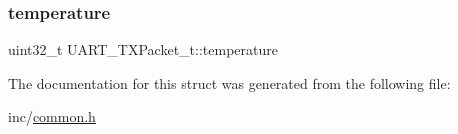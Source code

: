 \mbox{\label{struct_u_a_r_t___t_x_packet__t_a2cbdec2b2e2d42b9dacc50ebcc7e5cf4}} 
\subsubsection{\texorpdfstring{temperature}{temperature}}
{\footnotesize\ttfamily uint32\+\_\+t U\+A\+R\+T\+\_\+\+T\+X\+Packet\+\_\+t\+::temperature}



The documentation for this struct was generated from the following file\+:\begin{DoxyCompactItemize}
\item 
inc/\mbox{\hyperlink{common_8h}{common.\+h}}\end{DoxyCompactItemize}
